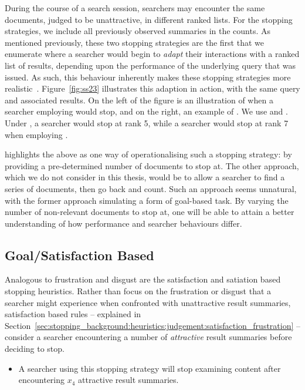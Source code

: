 During the course of a search session, searchers may encounter the same documents, judged to be unattractive, in different ranked lists. For the stopping strategies, we include all previously observed summaries in the counts. As mentioned previously, these two stopping strategies are the first that we enumerate where a searcher would begin to \emph{adapt} their interactions with a ranked list of results, depending upon the performance of the underlying query that was issued. As such, this behaviour inherently makes these stopping strategies more realistic~\cite{moffat2013users_versus_models}. Figure~\ref{fig:ss23} illustrates this adaption in action, with the same query and associated results. On the left of the figure is an illustration of when a searcher employing  would stop, and on the right, an example of . We use  and . Under , a searcher would stop at rank 5, while a searcher would stop at rank 7 when employing .

\cite{cooper1973retrieval_effectiveness_ii} highlights the above as one way of operationalising such a stopping strategy: by providing a pre-determined number of documents to stop at. The other approach, which we do not consider in this thesis, would be to allow a searcher to find a series of documents, then go back and count. Such an approach seems unnatural, with the former approach simulating a form of goal-based task. By varying the number of non-relevant documents to stop at, one will be able to attain a better understanding of how performance and searcher behaviours differ.

\subsection{Goal/Satisfaction Based}
Analogous to frustration and disgust are the satisfaction and satiation based~\citep{simon1955satiation} stopping heuristics. Rather than focus on the frustration or disgust that a searcher might experience when confronted with unattractive result summaries, satisfaction based rules -- explained in Section~\ref{sec:stopping_background:heuristics:judgement:satisfaction_frustration} -- consider a searcher encountering a number of \emph{attractive} result summaries before deciding to stop.

\begin{itemize}
    \item{ A searcher using this stopping strategy will stop examining content after encountering $x_4$ attractive result summaries.}
\end{itemize}

